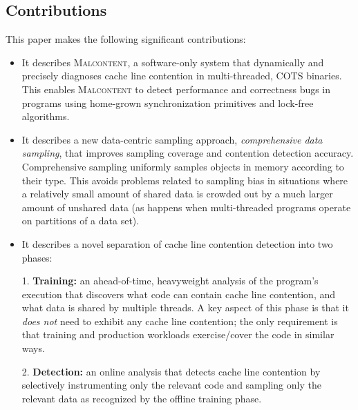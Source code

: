 \documentclass[letterpaper,twocolumn,10pt]{article}
\newcommand{\TextToolname}{Malcontent}
\newcommand{\Toolname}{\textsc{\TextToolname{}}}
\begin{document}
\subsection{Contributions}
This paper makes the following significant contributions:
\begin{itemize}
\item It describes \Toolname{}, a software-only system that dynamically and precisely diagnoses cache line
contention in multi-threaded, COTS binaries. This enables \Toolname{} to detect performance
and correctness bugs in programs using home-grown synchronization primitives and lock-free algorithms.

\item It describes a new data-centric sampling approach, \emph{comprehensive data sampling}, that improves
sampling coverage and contention detection accuracy. Comprehensive sampling uniformly samples objects in
memory  according to their type. This avoids problems related to sampling bias in situations where a
relatively small amount of shared data is crowded out by a much larger amount of unshared data (as happens
when multi-threaded programs operate on partitions of a data set).


\item It describes a novel separation of cache line contention detection into two phases:

1. {\bf Training:} an ahead-of-time, heavyweight analysis of the program's execution that
discovers what code can contain cache line contention, and what data is shared by multiple threads. A key
aspect of this phase is that it \emph{does not} need to exhibit any cache line contention; the only requirement
is that training and production workloads exercise/cover the code in similar ways.


2. {\bf Detection:} an online analysis that detects cache line contention by selectively
instrumenting only the relevant code and sampling only the relevant data as recognized by the
offline training phase.


\end{itemize}
\end{document}
